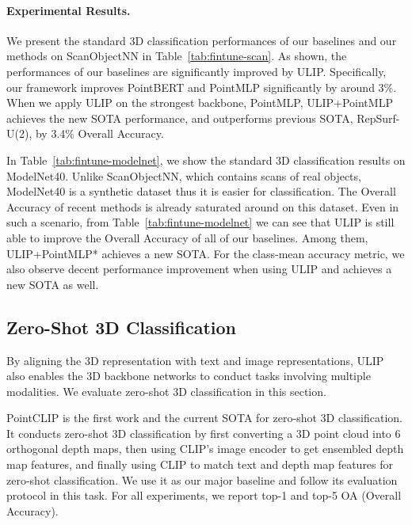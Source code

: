 \documentclass[10pt,twocolumn,letterpaper]{article}
\begin{document}
\vspace{-10pt}
\paragraph{Experimental Results.}
We present the standard 3D classification performances of our baselines and our methods on ScanObjectNN in Table~\ref{tab:fintune-scan}. As shown, the performances of our baselines are significantly improved by ULIP. Specifically, our framework improves PointBERT and PointMLP significantly by around 3\%.
When we apply ULIP on the strongest backbone, PointMLP, ULIP+PointMLP achieves the new SOTA performance, and outperforms previous SOTA, RepSurf-U(2), by 3.4\% Overall Accuracy. 

In Table~\ref{tab:fintune-modelnet}, we show the standard 3D classification results on ModelNet40.
Unlike ScanObjectNN, which contains scans of real objects, ModelNet40 is a synthetic dataset thus it is easier for classification. The Overall Accuracy of recent methods is already saturated around  on this dataset.
Even in such a scenario, from Table~\ref{tab:fintune-modelnet} we can see that ULIP is still able to improve the Overall Accuracy of all of our baselines. Among them, ULIP+PointMLP* achieves a new SOTA.
For the class-mean accuracy metric, we also observe decent performance improvement when using ULIP and achieves a new SOTA as well.


\subsection{Zero-Shot 3D Classification}
By aligning the 3D representation with text and image representations, ULIP also enables the 3D backbone networks to conduct tasks involving multiple modalities. We evaluate zero-shot 3D classification in this section.

PointCLIP is the first work and the current SOTA for zero-shot 3D classification. It conducts zero-shot 3D classification by first converting a 3D point cloud into 6 orthogonal depth maps, then using CLIP's image encoder to get ensembled depth map features, and finally using CLIP to match text and depth map features for zero-shot classification. We use it as our major baseline and follow its evaluation protocol in this task. For all experiments, we report top-1 and top-5 OA (Overall Accuracy).
\end{document}
